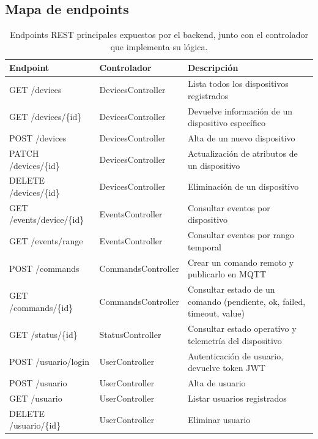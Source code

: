 \clearpage

\subsection{Mapa de endpoints}
\begin{table}[h]
	\centering
	\caption[Endpoints REST principales]{Endpoints REST principales expuestos por el backend, junto con el controlador que implementa su lógica.}
	\begin{tabular}{l l p{4.5cm}}    
		\toprule
		\textbf{Endpoint} & \textbf{Controlador} & \textbf{Descripción} \\
		\midrule
		GET /devices & DevicesController & Lista todos los dispositivos registrados \\
		GET /devices/\{id\} & DevicesController & Devuelve información de un dispositivo específico \\
		POST /devices & DevicesController & Alta de un nuevo dispositivo \\
		PATCH /devices/\{id\} & DevicesController & Actualización de atributos de un dispositivo \\
		DELETE /devices/\{id\} & DevicesController & Eliminación de un dispositivo \\
		\addlinespace
		GET /events/device/\{id\} & EventsController & Consultar eventos por dispositivo \\
		GET /events/range & EventsController & Consultar eventos por rango temporal \\
		\addlinespace
		POST /commands & CommandsController & Crear un comando remoto y publicarlo en MQTT \\
		GET /commands/\{id\} & CommandsController & Consultar estado de un comando (pendiente, ok, failed, timeout, value) \\
		\addlinespace
		GET /status/\{id\} & StatusController & Consultar estado operativo y telemetría del dispositivo \\
		\addlinespace
		POST /usuario/login & UserController & Autenticación de usuario, devuelve token JWT \\
		POST /usuario & UserController & Alta de usuario \\
		GET /usuario & UserController & Listar usuarios registrados \\
		DELETE /usuario/\{id\} & UserController & Eliminar usuario \\
		\bottomrule
		\hline
	\end{tabular}
	\label{tab:endpoints}
\end{table}


